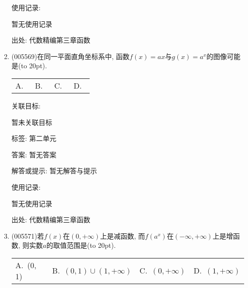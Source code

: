 \documentclass[10pt,a4paper]{article}
\newcommand{\bracket}[1]{(\hbox to #1pt{})}
\newcommand{\fourch}[4]{\par\begin{tabular}{p{.23\textwidth}p{.23\textwidth}p{.23\textwidth}p{.23\textwidth}}
A.~#1 &B.~#2& C.~#3& D.~#4
\end{tabular}}
\begin{document}
\begin{enumerate}[1.]
使用记录:

暂无使用记录


出处: 代数精编第三章函数
\item { (005569)}在同一平面直角坐标系中, 函数$f(x)=ax$与$g(x)=a^x$的图像可能是\bracket{20}.
\fourch{\begin{tikzpicture}[scale = 0.2, >=latex]
    \draw [->] (-8,0) -- (8,0) node [below] {$x$};
    \draw [->] (0,-4) -- (0,12) node [left] {$y$};
    \draw (0,0) node [below left] {$O$};
    \draw [domain = -6:2, samples = 100] plot (\x,{-1.5*\x});
    \draw [domain = -6:6, samples = 100] plot (\x,{1.5^\x});
\end{tikzpicture}}{\begin{tikzpicture}[scale = 0.2, >=latex]
    \draw [->] (-8,0) -- (8,0) node [below] {$x$};
    \draw [->] (0,-4) -- (0,12) node [left] {$y$};
    \draw (0,0) node [below left] {$O$};
    \draw [domain = -2:6, samples = 100] plot (\x,{1.5*\x});
    \draw [domain = -6:6, samples = 100] plot (-\x,{1.5^\x});
\end{tikzpicture}}{\begin{tikzpicture}[scale = 0.2, >=latex]
    \draw [->] (-8,0) -- (8,0) node [below] {$x$};
    \draw [->] (0,-4) -- (0,12) node [left] {$y$};
    \draw (0,0) node [below left] {$O$};
    \draw [domain = -2:6, samples = 100] plot (\x,{1.5*\x});
    \draw [domain = -6:6, samples = 100] plot (\x,{1.5^\x});
\end{tikzpicture}}{\begin{tikzpicture}[scale = 0.2, >=latex]
    \draw [->] (-8,0) -- (8,0) node [below] {$x$};
    \draw [->] (0,-4) -- (0,12) node [left] {$y$};
    \draw (0,0) node [below left] {$O$};
    \draw [domain = -2:6, samples = 100] plot (-\x,{1.5*\x});
    \draw [domain = -6:6, samples = 100] plot (-\x,{1.5^\x});
\end{tikzpicture}}


关联目标:

暂未关联目标



标签: 第二单元

答案: 暂无答案

解答或提示: 暂无解答与提示

使用记录:

暂无使用记录


出处: 代数精编第三章函数
\item { (005571)}若$f(x)$在$(0,+\infty)$上是减函数, 而$f(a^x)$在$(-\infty ,+\infty)$上是增函数, 则实数$a$的取值范围是\bracket{20}.
\fourch{(0, 1)}{$(0,1)\cup (1,+\infty)$}{$(0,+\infty)$}{$(1,+\infty)$}



\end{enumerate}
\end{document}
